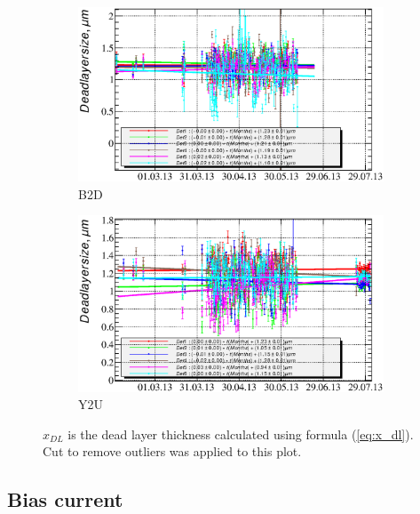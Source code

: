 \documentclass[a4paper,12pt]{article}
\begin{document}
\newcommand\xdllabel{$x_{DL}$ is the dead layer thickness calculated using formula (\ref{eq:x_dl}). Cut to remove
outliers was applied to this plot.}
\begin{figure}[p]
\begin{subfigure}[b]{0.5\textwidth}
\includegraphics[width=\textwidth]{gfx/run13_alpha_study/B2D/c_chDeadLayerSize_by_day_B2D.eps}
\caption{B2D}
\end{subfigure}
\begin{subfigure}[b]{0.5\textwidth}
\includegraphics[width=\textwidth]{gfx/run13_alpha_study/Y2U/c_chDeadLayerSize_by_day_Y2U.eps}
\caption{Y2U}
\end{subfigure}
\caption{\xdllabel}
\label{fig:x_dl}
\end{figure}

\subsection{Bias current}

\end{document}
